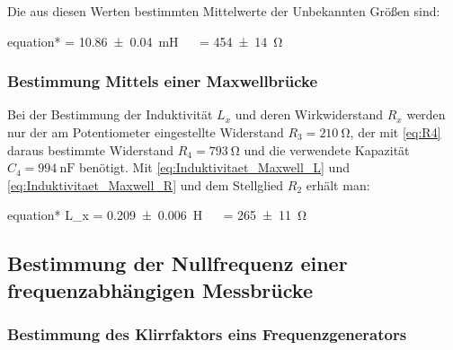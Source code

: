 		Die aus diesen Werten bestimmten Mittelwerte der Unbekannten Größen sind:
		\begin{empheq}{equation*}
				 = \SI{10.86(4)}{\milli\henry} \quad\ \ \quad {} = \SI{454(14)}{\ohm}
		\end{empheq}		
		
		
	\subsubsection{Bestimmung Mittels einer Maxwellbrücke}
	\label{sec:Auswertung_Induktivität_Maxwell}
		
		Bei der Bestimmung der Induktivität $L_{x}$ und deren Wirkwiderstand $R_{x}$ werden 
		nur der am Potentiometer eingestellte Widerstand $R_{3}= \SI{210}{\ohm} $, der mit \cref{eq:R4} 
		daraus bestimmte Widerstand $R_{4} = \SI{793}{\ohm}$ und die verwendete Kapazität $C_{4} = 
		\SI{994}{\nano\farad}$  benötigt. Mit \cref{eq:Induktivitaet_Maxwell_L} und \cref{eq:Induktivitaet_Maxwell_R}
		und dem Stellglied $R_{2}$ erhält man:
		\begin{empheq}{equation*}
				{L_{x}} = \SI{0.209(6)}{\henry} \quad\ \  = \SI{265(11)}{\ohm}
		\end{empheq}
		
		
		
\subsection{Bestimmung der Nullfrequenz einer frequenzabhängigen Messbrücke}
\label{sec:Auswertung_Frequenz}

\subsubsection{Bestimmung des Klirrfaktors eins Frequenzgenerators}
\label{sec:Auswertung_Klirrfaktor}